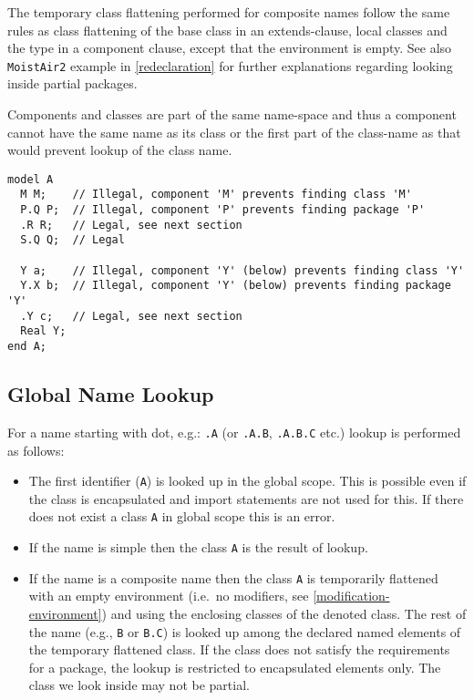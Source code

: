 \begin{nonnormative}
The temporary class flattening performed for composite names
follow the same rules as class flattening of the base class in an
extends-clause, local classes and the type in a component clause, except
that the environment is empty. See also \lstinline!MoistAir2! example in
\cref{redeclaration} for further explanations regarding looking inside
partial packages.
\end{nonnormative}
\begin{example}
Components and classes are part of the same name-space and thus a component cannot
have the same name as its class or the first part of the class-name as that
would prevent lookup of the class name.
\begin{lstlisting}[language=modelica]
model A
  M M;    // Illegal, component 'M' prevents finding class 'M'
  P.Q P;  // Illegal, component 'P' prevents finding package 'P'
  .R R;   // Legal, see next section
  S.Q Q;  // Legal

  Y a;    // Illegal, component 'Y' (below) prevents finding class 'Y'
  Y.X b;  // Illegal, component 'Y' (below) prevents finding package 'Y'
  .Y c;   // Legal, see next section
  Real Y;
end A;
\end{lstlisting}
\end{example}

\subsection{Global Name Lookup}\label{global-name-lookup}

For a name starting with dot, e.g.: \lstinline!.A! (or \lstinline!.A.B!, \lstinline!.A.B.C! etc.) lookup is performed as follows:
\begin{itemize}
\item
  The first identifier (\lstinline!A!) is looked up in the global scope. This is
  possible even if the class is encapsulated and import statements are
  not used for this. If there does not exist a class \lstinline!A! in global scope
  this is an error.
\item
  If the name is simple then the class \lstinline!A! is the result of lookup.
\item
  If the name is a composite name then the class \lstinline!A! is temporarily
  flattened with an empty environment (i.e.\ no modifiers, see
  \cref{modification-environment}) and using the enclosing classes of the denoted class. The rest
  of the name (e.g., \lstinline!B! or \lstinline!B.C!) is looked up among the declared named
  elements of the temporary flattened class. If the class does not
  satisfy the requirements for a package, the lookup is restricted to
  encapsulated elements only. The class we look inside may not be
  partial.
\end{itemize}

